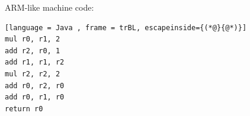 ARM-like machine code:
\begin{lstlisting}[language = Java , frame = trBL, escapeinside={(*@}{@*)}]
mul r0, r1, 2
add r2, r0, 1
add r1, r1, r2
mul r2, r2, 2
add r0, r2, r0
add r0, r1, r0
return r0
\end{lstlisting}